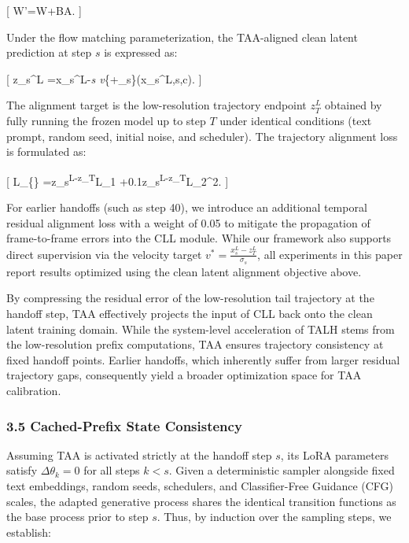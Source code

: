 {[} W'=W+BA. {]}

Under the flow matching parameterization, the TAA-aligned clean latent prediction at step \(s\) is expressed as:

{[} \widetilde z\_s\^{}L =x\_s\^{}L-\sigma\emph{s v}\{\phi+\Delta\theta\_s\}(x\_s\^{}L,s,c). {]}

The alignment target is the low-resolution trajectory endpoint \(z_T^L\) obtained by fully running the frozen model up to step \(T\) under identical conditions (text prompt, random seed, initial noise, and scheduler). The trajectory alignment loss is formulated as:

{[} \mathcal L\_\{\} =\lVert\widetilde z\_s\textsuperscript{L-z\_T}L\rVert\_1 +0.1\lVert\widetilde z\_s\textsuperscript{L-z\_T}L\rVert\_2\^{}2. {]}

For earlier handoffs (such as step 40), we introduce an additional temporal residual alignment loss with a weight of 0.05 to mitigate the propagation of frame-to-frame errors into the CLL module. While our framework also supports direct supervision via the velocity target \(v^*=\frac{x_s^L-z_T^L}{\sigma_s}\), all experiments in this paper report results optimized using the clean latent alignment objective above.

By compressing the residual error of the low-resolution tail trajectory at the handoff step, TAA effectively projects the input of CLL back onto the clean latent training domain. While the system-level acceleration of TALH stems from the low-resolution prefix computations, TAA ensures trajectory consistency at fixed handoff points. Earlier handoffs, which inherently suffer from larger residual trajectory gaps, consequently yield a broader optimization space for TAA calibration.

\hypertarget{cached-prefix-state-consistency}{%
\subsubsection{3.5 Cached-Prefix State Consistency}\label{cached-prefix-state-consistency}}

Assuming TAA is activated strictly at the handoff step \(s\), its LoRA parameters satisfy \(\Delta\theta_k=0\) for all steps \(k < s\). Given a deterministic sampler alongside fixed text embeddings, random seeds, schedulers, and Classifier-Free Guidance (CFG) scales, the adapted generative process shares the identical transition functions as the base process prior to step \(s\). Thus, by induction over the sampling steps, we establish:

